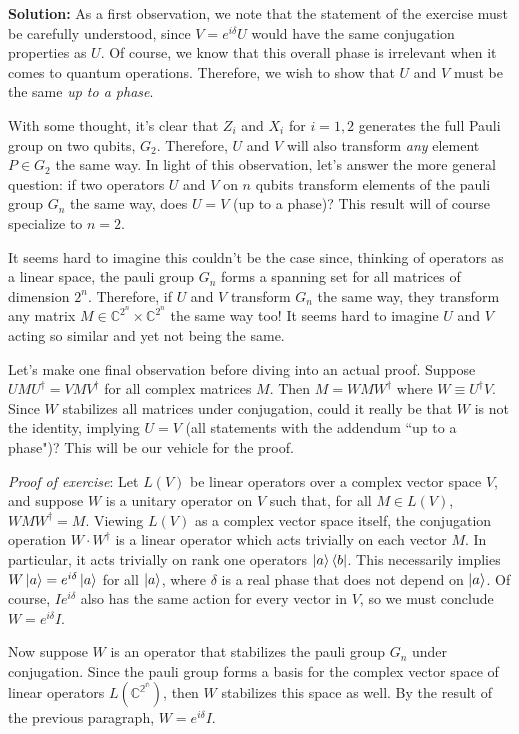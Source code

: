 \documentclass{book}
\begin{document}
    \textbf{Solution:} As a first observation, we note that the statement of the exercise must be carefully understood, since $V = e^{i\delta} U$ would have the same conjugation properties as $U$. Of course, we know that this overall phase is irrelevant when it comes to quantum operations. Therefore, we wish to show that $U$ and $V$ must be the same \emph{up to a phase}.
    
    With some thought, it's clear that $Z_i$ and $X_i$ for $i=1,2$ generates the full Pauli group on two qubits, $G_2$. Therefore, $U$ and $V$ will also transform \emph{any} element $P\in G_2$ the same way. In light of this observation, let's answer the more general question: if two operators $U$ and $V$ on $n$ qubits transform elements of the pauli group $G_n$ the same way, does $U = V$ (up to a phase)? This result will of course specialize to $n=2$.
    
    It seems hard to imagine this couldn't be the case since, thinking of operators as a linear space, the pauli group $G_n$ forms a spanning set for all matrices of dimension $2^n$. Therefore, if $U$ and $V$ transform $G_n$ the same way, they transform any matrix $M \in \mathbb{C}^{2^n} \times \mathbb{C}^{2^n}$ the same way too! It seems hard to imagine $U$ and $V$ acting so similar and yet not being the same.
    
    Let's make one final observation before diving into an actual proof. Suppose $U M U^\dagger = V M V^\dagger$ for all complex matrices $M$. Then $M = W M W^\dagger$ where $W \equiv U^\dagger V$. Since $W$ stabilizes all matrices under conjugation, could it really be that $W$ is not the identity, implying $U = V$ (all statements with the addendum ``up to a phase")? This will be our vehicle for the proof. 
    
    \emph{Proof of exercise}: Let $L(V)$ be linear operators over a complex vector space $V$, and suppose $W$ is a unitary operator on $V$ such that, for all $M \in L(V)$, $W M W^\dagger = M$. Viewing $L(V)$ as a complex vector space itself, the conjugation operation $W \cdot W^\dagger$ is a linear operator which acts trivially on each vector $M$. In particular, it acts trivially on rank one operators $\ket{a}\bra{b}$. This necessarily implies $W \ket{a} = e^{i\delta} \ket{a}$ for all $\ket{a}$, where $\delta$ is a real phase that does not depend on $\ket{a}$. Of course, $I e^{i\delta}$ also has the same action for every vector in $V$, so we must conclude $W = e^{i\delta} I$. 
    
    Now suppose $W$ is an operator that stabilizes the pauli group $G_n$ under conjugation. Since the pauli group forms a basis for the complex vector space of linear operators $L(\mathbb{C^{2^n}})$, then $W$ stabilizes this space as well. By the result of the previous paragraph, $W = e^{i\delta} I$.
    
\end{document}
